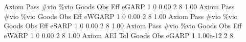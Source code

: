        Axiom {\VBAR} Pass        \#vio        \%vio       Goods         Obs         Eff  
       eGARP {\VBAR}    1           0        0.00           2           8        1.00  
{\smallskip}
{\smallskip}
{\smallskip}
       Axiom {\VBAR} Pass        \#vio        \%vio       Goods         Obs         Eff  
      eWGARP {\VBAR}    1           0        0.00           2           8        1.00  
{\smallskip}
{\smallskip}
{\smallskip}
       Axiom {\VBAR} Pass        \#vio        \%vio       Goods         Obs         Eff  
       eSARP {\VBAR}    1           0        0.00           2           8        1.00  
{\smallskip}
{\smallskip}
{\smallskip}
       Axiom {\VBAR} Pass        \#vio        \%vio       Goods         Obs         Eff  
       eWARP {\VBAR}    1           0        0.00           2           8        1.00  
{\smallskip}
       Axiom {\VBAR}       AEI        Tol      Goods        Obs 
       eGARP {\VBAR}         1   1.00e-12          2          8 
